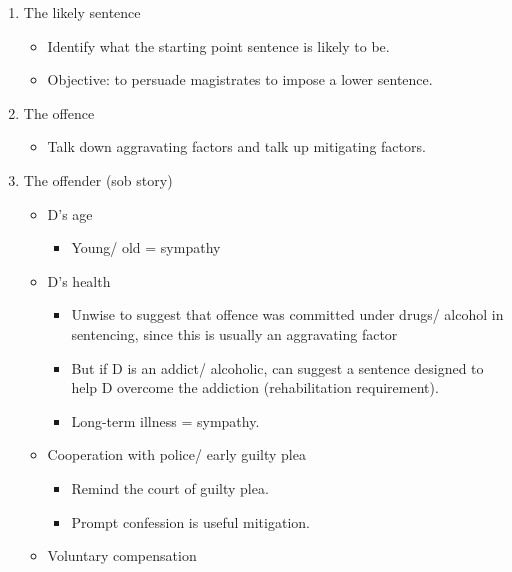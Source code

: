 \documentclass[
]{article}
\providecommand{\tightlist}{%
  \setlength{\itemsep}{0pt}\setlength{\parskip}{0pt}}
\begin{document}
\begin{enumerate}
\def\labelenumi{\arabic{enumi}.}
\tightlist
\item
  The likely sentence

  \begin{itemize}
  \tightlist
  \item
    Identify what the starting point sentence is likely to be.
  \item
    Objective: to persuade magistrates to impose a lower sentence.
  \end{itemize}
\item
  The offence

  \begin{itemize}
  \tightlist
  \item
    Talk down aggravating factors and talk up mitigating factors.
  \end{itemize}
\item
  The offender (sob story)

  \begin{itemize}
  \tightlist
  \item
    D's age

    \begin{itemize}
    \tightlist
    \item
      Young/ old = sympathy
    \end{itemize}
  \item
    D's health

    \begin{itemize}
    \tightlist
    \item
      Unwise to suggest that offence was committed under drugs/ alcohol
      in sentencing, since this is usually an aggravating factor
    \item
      But if D is an addict/ alcoholic, can suggest a sentence designed
      to help D overcome the addiction (rehabilitation requirement).
    \item
      Long-term illness = sympathy.
    \end{itemize}
  \item
    Cooperation with police/ early guilty plea

    \begin{itemize}
    \tightlist
    \item
      Remind the court of guilty plea.
    \item
      Prompt confession is useful mitigation.
    \end{itemize}
  \item
    Voluntary compensation


\end{itemize}
\end{enumerate}
\end{document}
